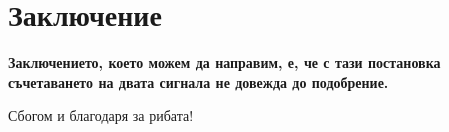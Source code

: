 \documentclass[9pt]{beamer}
\begin{document}
    \section{Заключение}
    \begin{frame}[t]
        \begin{center}
            \textbf{Заключението, което можем да направим, е, че с тази постановка съчетаването на двата сигнала не довежда до подобрение.}
        \end{center}
        \vspace{5cm}
        \begin{center}
            {\footnotesize Сбогом и благодаря за рибата!}
        \end{center}
    \end{frame}
\end{document}
